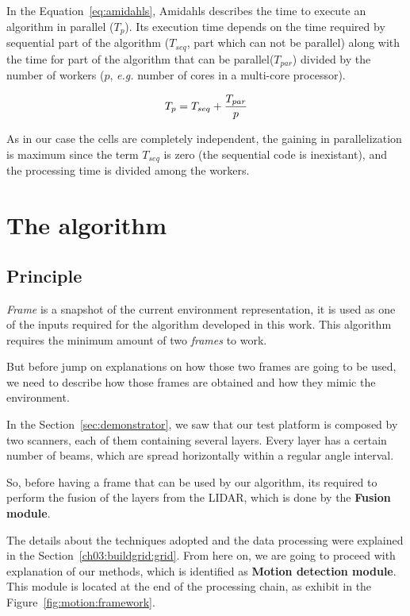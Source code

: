 In the Equation~\ref{eq:amidahls}, Amidahls describes the time to execute an algorithm in parallel ($T_p$). Its execution time depends on the time required by sequential part of the algorithm ($T_{seq}$, part which can not be parallel) along with the time for part of the algorithm that can be parallel($T_{par}$) divided by the number of workers ($p$, \textit{e.g.} number of cores in a multi-core processor).

\begin{equation}
\label{eq:amidahls}
T_p=T_{seq}+{T_{par} \over p}
\end{equation}

As in our case the cells are completely independent, the gaining in parallelization is maximum since the term $T_{seq}$ is zero (the sequential code is inexistant), and the processing time is divided among the workers.

\section{The algorithm}

\subsection{Principle} 

\textit{Frame} is a snapshot of the current environment representation, it is used as one of the inputs required for the algorithm developed in this work. This algorithm requires the minimum amount of two \textit{frames} to work. 

But before jump on explanations on how those two frames are going to be used, we need to describe how those frames are obtained and how they mimic the environment.

In the Section~\ref{sec:demonstrator}, we saw that our test platform is composed by two scanners, each of them containing several layers. Every layer has a certain number of beams, which are spread horizontally within a regular angle interval. 

So, before having a frame that can be used by our algorithm, its required to perform the fusion of the layers from the LIDAR, which is done by the \textbf{Fusion module}. 

The details about the techniques adopted and the data processing were explained in the Section~\ref{ch03:buildgrid:grid}. From here on, we are going to proceed with explanation of our methods, which is identified as \textbf{Motion detection module}. This module is located at the end of the processing chain, as exhibit in the Figure~\ref{fig:motion:framework}. 


